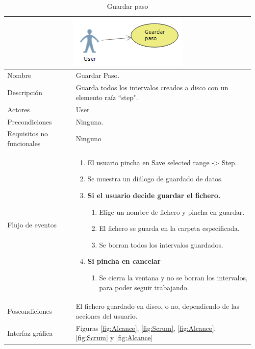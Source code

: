 \begin{table}[H]
	\begin{center}
		\begin{tabular}{|l*{1}{p{10cm}}|}
			
			\multicolumn{2}{c}{\includegraphics[width=0.4\linewidth]{./Figures/GuardarPaso.png}} \\
			\hline
		    Nombre                     & Guardar Paso. \\
		    Descripci\'on              & Guarda todos los intervalos creados
		    							 a disco con un elemento ra\'iz ``step".\\ 
		    Actores                    & User  \\
		    Precondiciones             & Ninguna.  \\
		    Requisitos no funcionales  & Ninguno  \\
		    Flujo de eventos           & \begin{enumerate}
		    								\item El usuario pincha en Save selected range -> Step.
		    								\item Se muestra un di\'alogo de guardado de datos.
		    								\item \textbf{Si el usuario decide guardar
		    								el fichero.}
		    								\begin{enumerate}
		    									\item Elige un nombre de fichero y pincha
		    									en guardar.
		    									\item El fichero se guarda en la carpeta
		    									especificada.
		    									\item Se borran todos los intervalos
		    									guardados.
		    								\end{enumerate}
		    								\item \textbf{Si pincha en cancelar}
		    								\begin{enumerate}
		    									\item Se cierra la ventana y no se borran
		    									los intervalos, para poder seguir trabajando.
		    								\end{enumerate}
		    								
		    							 \end{enumerate} \\
		    Poscondiciones			   & El fichero guardado en disco, o no,
		    						     dependiendo de las acciones del usuario.  \\
		    Interfaz gr\'afica		   & Figuras \ref{fig:Alcance}, \ref{fig:Scrum},
		    							 \ref{fig:Alcance}, \ref{fig:Scrum} y \ref{fig:Alcance}\\
		    \hline
		\end{tabular}
	\caption[Guardar paso]{Guardar paso}
	\label{Guardar paso}
	\end{center}
\end{table}

